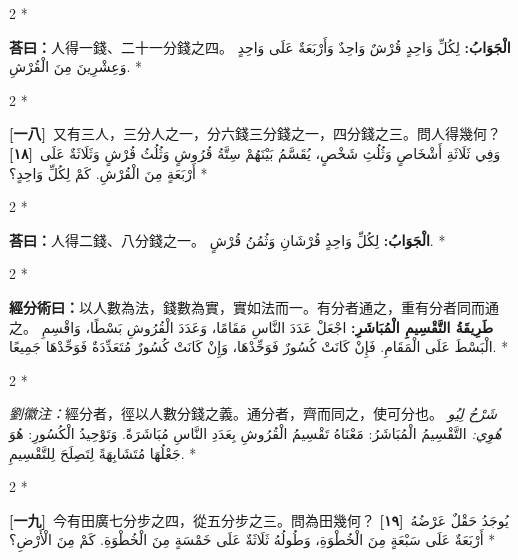 \documentclass[11pt,a4paper]{article}
\newcommand{\ar}[1]{\arabicfont\beginR #1\endR}
\newcommand{\problemnum}[1]{\textbf{[\ignorespaces#1\unskip]}}
\newenvironment{bilingual}{%
  \begin{paracol}{2}%
  \switchcolumn[0]*%
}{%
  \end{paracol}%
}
\newcommand{\cnline}[1]{\switchcolumn[0]\noindent #1 \switchcolumn[1]}
\newcommand{\arline}[1]{\noindent\ar{#1} \switchcolumn[0]*}
\newenvironment{prob bilingual}{%
  \begin{paracol}{2}%
  \switchcolumn[0]*%
}{%
  \end{paracol}%
  \vspace{0.3em}%
}
\begin{document}
\begin{bilingual}
\cnline{\textcolor{answercolor}{\textbf{荅曰：}}人得一錢、二十一分錢之四。}
\arline{\textcolor{answercolor}{\textbf{الْجَوَابُ:}} لِكُلِّ وَاحِدٍ قُرْشٌ وَاحِدٌ وَأَرْبَعَةٌ عَلَى وَاحِدٍ وَعِشْرِينَ مِنَ الْقُرْشِ.}
\end{bilingual}

\begin{bilingual}
\cnline{\problemnum{一八}\, 又有三人，三分人之一，分六錢三分錢之一，四分錢之三。問人得幾何？}
\arline{\problemnum{١٨}\, وَفِي ثَلَاثَةِ أَشْخَاصٍ وَثُلُثِ شَخْصٍ، يُقَسَّمُ بَيْنَهُمْ سِتَّةُ قُرُوشٍ وَثُلُثُ قُرْشٍ وَثَلَاثَةٌ عَلَى أَرْبَعَةٍ مِنَ الْقُرْشِ. كَمْ لِكُلِّ وَاحِدٍ؟}
\end{bilingual}

\begin{bilingual}
\cnline{\textcolor{answercolor}{\textbf{荅曰：}}人得二錢、八分錢之一。}
\arline{\textcolor{answercolor}{\textbf{الْجَوَابُ:}} لِكُلِّ وَاحِدٍ قُرْشَانِ وَثُمُنُ قُرْشٍ.}
\end{bilingual}

\begin{bilingual}
\cnline{%
\textcolor{methodcolor}{\textbf{經分術曰：}}以人數為法，錢數為實，實如法而一。有分者通之，重有分者同而通之。
}
\arline{%
\textcolor{methodcolor}{\textbf{طَرِيقَةُ التَّقْسِيمِ الْمُبَاشَرِ:}} اجْعَلْ عَدَدَ النَّاسِ مَقَامًا، وَعَدَدَ الْقُرُوشِ بَسْطًا، وَاقْسِمِ الْبَسْطَ عَلَى الْمَقَامِ. فَإِنْ كَانَتْ كُسُورٌ فَوَحِّدْهَا، وَإِنْ كَانَتْ كُسُورٌ مُتَعَدِّدَةٌ فَوَحِّدْهَا جَمِيعًا.
}
\end{bilingual}

\begin{bilingual}
\cnline{%
\textcolor{commentarycolor}{\small\textit{劉徽注：}}經分者，徑以人數分錢之義。通分者，齊而同之，使可分也。
}
\arline{%
\textcolor{commentarycolor}{\small\textit{شَرْحُ لِيُو هُوِي:}} التَّقْسِيمُ الْمُبَاشَرُ: مَعْنَاهُ تَقْسِيمُ الْقُرُوشِ بِعَدَدِ النَّاسِ مُبَاشَرَةً. وَتَوْحِيدُ الْكُسُورِ: هُوَ جَعْلُهَا مُتَشَابِهَةً لِتَصِلَحَ لِلتَّقْسِيمِ.
}
\end{bilingual}

\begin{bilingual}
\cnline{\problemnum{一九}\, 今有田廣七分步之四，從五分步之三。問為田幾何？}
\arline{\problemnum{١٩}\, يُوجَدُ حَقْلٌ عَرْضُهُ أَرْبَعَةٌ عَلَى سَبْعَةٍ مِنَ الْخُطْوَةِ، وَطُولُهُ ثَلَاثَةٌ عَلَى خَمْسَةٍ مِنَ الْخُطْوَةِ. كَمْ مِنَ الْأَرْضِ؟}
\end{bilingual}
\end{document}
